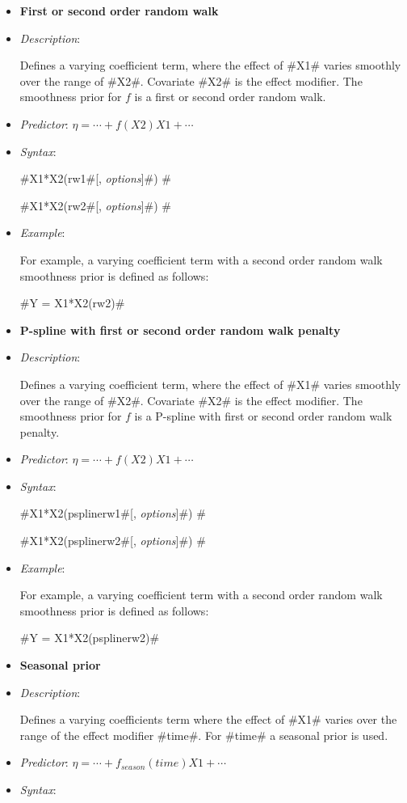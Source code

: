 \begin{itemize}
\item[]{\bf\sffamily First or second order random walk}

\item[] {\em Description}:

Defines a varying coefficient term, where the effect of #X1#
varies smoothly over the range of #X2#. Covariate #X2# is the
effect modifier. The smoothness prior for $f$ is a first or second
order random walk.
\item[] {\em Predictor}: $\eta= \cdots + f(X2)X1 + \cdots$
\item[] {\em Syntax}:

#X1*X2(rw1#[, {\em options}]#) #

#X1*X2(rw2#[, {\em options}]#) #
\item[] {\em Example}:

For example, a varying coefficient term with a second order random
walk smoothness prior is defined as follows:

#Y = X1*X2(rw2)#

\item[] {\bf\sffamily P-spline with first or second order random
walk penalty}

\item[] {\em Description}:

Defines a varying coefficient term, where the effect of #X1#
varies smoothly over the range of #X2#. Covariate #X2# is the
effect modifier. The smoothness prior for $f$ is a P-spline with
first or second order random walk penalty.
\item[] {\em Predictor}: $\eta= \cdots + f(X2)X1 + \cdots$
\item[] {\em Syntax}:

#X1*X2(psplinerw1#[, {\em options}]#) #

#X1*X2(psplinerw2#[, {\em options}]#) #
\item[] {\em Example}:

For example, a varying coefficient term with a second order random
walk smoothness prior is defined as follows:

#Y = X1*X2(psplinerw2)#

\item[]{\bf\sffamily Seasonal prior}

\item[] {\em Description}:

Defines a varying coefficients term where the effect of #X1# varies
over the range of the effect modifier #time#. For #time# a seasonal
prior is used.
\item[] {\em Predictor}: $\eta= \cdots + f_{season}(time)X1 + \cdots $
\item[] {\em Syntax}:


\end{itemize}
